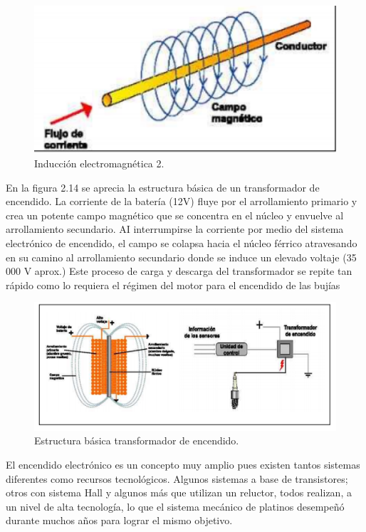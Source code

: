 \begin{figure}[H]
\centering
\includegraphics[width=12cm]{capitulo3/figs/trans2.png}
\caption{ Inducción electromagnética 2.}
\end{figure}

En la figura 2.14 se aprecia la estructura básica de un transformador
de encendido. La corriente de la batería (12V) fluye por el arrollamiento
primario y crea un potente campo magnético que se concentra en el
núcleo y envuelve al arrollamiento secundario. AI interrumpirse la corriente
por medio del sistema electrónico de encendido, el campo se colapsa
hacia el núcleo férrico atravesando en su camino al arrollamiento
secundario donde se induce un elevado voltaje (35 000 V aprox.) Este
proceso de carga y descarga del transformador se repite tan rápido como
lo requiera el régimen del motor para el encendido de las bujías


\begin{figure}[H]
\centering
\includegraphics[width=12cm]{capitulo3/figs/trans3.png}
\caption{ Estructura básica transformador de encendido.}
\end{figure}

El encendido electrónico es un concepto muy amplio pues existen
tantos sistemas diferentes como recursos tecnológicos. Algunos sistemas
a base de transistores; otros con sistema Hall y algunos más que utilizan
un reluctor, todos realizan, a un nivel de alta tecnología, lo que el sistema
mecánico de platinos desempeñó durante muchos años para lograr el
mismo objetivo.\\

